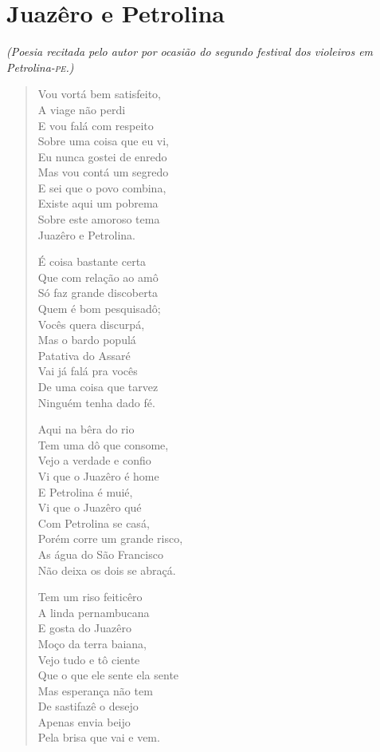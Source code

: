 \chapter{Juazêro e Petrolina}

\begin{flushright}
\emph{(Poesia recitada pelo autor por ocasião do segundo festival dos
violeiros em Petrolina-\textsc{pe}.)}
\end{flushright}

\begin{verse}
Vou vortá bem satisfeito,\\
A viage não perdi\\
E vou falá com respeito\\
Sobre uma coisa que eu vi,\\
Eu nunca gostei de enredo\\
Mas vou contá um segredo\\
E sei que o povo combina,\\
Existe aqui um pobrema\\
Sobre este amoroso tema\\
Juazêro e Petrolina.

É coisa bastante certa\\
Que com relação ao amô\\
Só faz grande discoberta\\
Quem é bom pesquisadô;\\
Vocês quera discurpá,\\
Mas o bardo populá\\
Patativa do Assaré\\
Vai já falá pra vocês\\
De uma coisa que tarvez\\
Ninguém tenha dado fé.

Aqui na bêra do rio\\
Tem uma dô que consome,\\
Vejo a verdade e confio\\
Vi que o Juazêro é home\\
E Petrolina é muié,\\
Vi que o Juazêro qué\\
Com Petrolina se casá,\\
Porém corre um grande risco,\\
As água do São Francisco\\
Não deixa os dois se abraçá.

Tem um riso feiticêro\\
A linda pernambucana\\
E gosta do Juazêro\\
Moço da terra baiana,\\
Vejo tudo e tô ciente\\
Que o que ele sente ela sente\\
Mas esperança não tem\\
De sastifazê o desejo\\
Apenas envia beijo\\
Pela brisa que vai e vem.


\end{verse}
